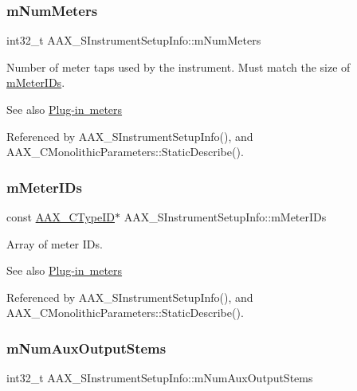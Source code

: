 \subsubsection{\texorpdfstring{mNumMeters}{mNumMeters}}
{\footnotesize\ttfamily int32\+\_\+t A\+A\+X\+\_\+\+S\+Instrument\+Setup\+Info\+::m\+Num\+Meters}



Number of meter taps used by the instrument. Must match the size of \mbox{\hyperlink{a01957_a996dacfece0048579de34e08cb10b449}{m\+Meter\+I\+Ds}}. 

\begin{DoxySeeAlso}{See also}
\mbox{\hyperlink{a00807}{Plug-\/in meters}} 
\end{DoxySeeAlso}


Referenced by A\+A\+X\+\_\+\+S\+Instrument\+Setup\+Info(), and A\+A\+X\+\_\+\+C\+Monolithic\+Parameters\+::\+Static\+Describe().

\mbox{\label{a01957_a996dacfece0048579de34e08cb10b449}} 
\subsubsection{\texorpdfstring{mMeterIDs}{mMeterIDs}}
{\footnotesize\ttfamily const \mbox{\hyperlink{a00392_ac678f9c1fbcc26315d209f71a147a175}{A\+A\+X\+\_\+\+C\+Type\+ID}}$\ast$ A\+A\+X\+\_\+\+S\+Instrument\+Setup\+Info\+::m\+Meter\+I\+Ds}



Array of meter I\+Ds. 

\begin{DoxySeeAlso}{See also}
\mbox{\hyperlink{a00807}{Plug-\/in meters}} 
\end{DoxySeeAlso}


Referenced by A\+A\+X\+\_\+\+S\+Instrument\+Setup\+Info(), and A\+A\+X\+\_\+\+C\+Monolithic\+Parameters\+::\+Static\+Describe().

\mbox{\label{a01957_ac969f7d3a23a8bb66d53c8e6d8360dca}} 
\subsubsection{\texorpdfstring{mNumAuxOutputStems}{mNumAuxOutputStems}}
{\footnotesize\ttfamily int32\+\_\+t A\+A\+X\+\_\+\+S\+Instrument\+Setup\+Info\+::m\+Num\+Aux\+Output\+Stems}



